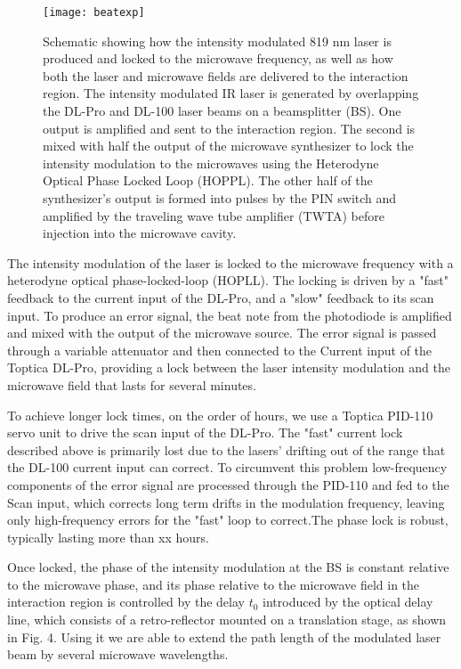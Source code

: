 \documentclass[aps,pra,preprint,groupedaddress]{revtex4-1}
\begin{document}
\begin{figure}
	\texttt{[image: beatexp]}
	\caption{Schematic showing how the intensity modulated 819 nm laser is produced and locked to the microwave frequency, as well as how both the laser and microwave fields are delivered to the interaction region. The intensity modulated IR laser is generated by overlapping the DL-Pro and DL-100 laser beams on a beamsplitter (BS). One output is amplified and sent to the interaction region. The second is mixed with half the output of the microwave synthesizer to lock the intensity modulation to the microwaves using the Heterodyne Optical Phase Locked Loop (HOPPL). The other half of the synthesizer's output is formed into pulses by the PIN switch and amplified by the traveling wave tube amplifier (TWTA) before injection into the microwave cavity. }
	\label{fig:pll}
\end{figure}


The intensity modulation of the laser is locked to the microwave frequency with a heterodyne optical phase-locked-loop (HOPLL). The locking is driven by a "fast" feedback to the current input of the DL-Pro, and a "slow" feedback to its scan input. To produce an error signal, the beat note from the photodiode is amplified and mixed with the output of the microwave source. The error signal is passed through a variable attenuator and then connected to the Current input of the Toptica DL-Pro, providing a lock between the laser intensity modulation and the microwave field that lasts for several minutes.


To achieve longer lock times, on the order of hours, we use a Toptica PID-110 servo unit to drive the scan input of the DL-Pro. The "fast" current lock described above is primarily lost due to the lasers' drifting out of the range that the DL-100 current input can correct. To circumvent this problem low-frequency components of the error signal are processed through the PID-110 and fed to the Scan input, which corrects long term drifts in the modulation frequency, leaving only high-frequency errors for the "fast" loop to correct.The phase lock is robust, typically lasting more than xx hours.


Once locked, the phase of the intensity modulation at the BS is constant relative to the microwave phase, and its phase relative to the microwave field in the interaction region is controlled by the delay $t_0$ introduced by the optical delay line, which consists of a retro-reflector mounted on a translation stage, as shown in Fig. 4. Using it we are able to extend the path length of the modulated laser beam by several microwave wavelengths.
\end{document}
